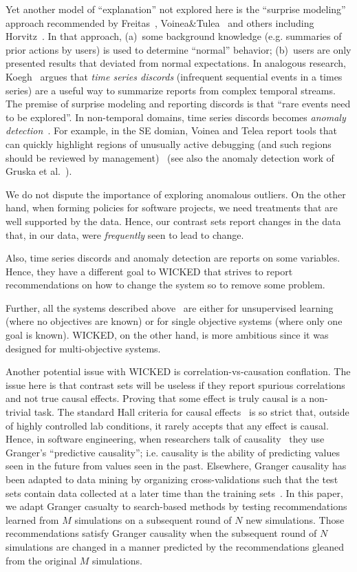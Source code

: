 \documentclass[runningheads]{llncs}
\begin{document}
Yet another model of ``explanation'' not explored
here is the ``surprise modeling'' approach
recommended by 
Freitas~\cite{Freitas98onobjective}, Voinea\&Tulea~\cite{voinea07} and
others including Horvitz~\cite{horvitz05}. In that
approach, (a)~some background knowledge
(e.g. summaries of prior actions by users) is used
to determine ``normal'' behavior; (b)~users are only
presented results that deviated from normal
expectations. In analogous research,
Koegh~\cite{keogh05} argues that {\em time series
  discords} (infrequent sequential events in a times
series) are a useful way to summarize reports from
complex temporal streams. The premise of surprise
modeling and reporting discords is that ``rare
events need to be explored''.  
In non-temporal domains, time series discords becomes
{\em anomaly detection}~\cite{chandola09}. For example, in the SE domian,
Voinea and Telea report tools that can quickly highlight regions
of unusually active debugging (and such regions should be reviewed
by management)~\cite{voiena07} (see also the anomaly
detection work of Gruska et al.~\cite{gruska10}).

We do not dispute the
importance of exploring anomalous outliers.  On the other
hand, when forming policies for software projects,
we need treatments that are well supported by the
data. Hence, our contrast sets report changes in the
data that, in our data, were {\em frequently} seen to
lead to change. 

Also, time series discords and anomaly detection are reports
on some variables. Hence, they have a different goal to WICKED that
strives to report recommendations on how to change the system
so to remove some problem. 

Further, all the systems described
above~\cite{voinea07,horvitz05,keogh05,gruska10} are
either for unsupervised learning (where no
objectives are known) or for single objective
systems (where only one goal is known). WICKED, on the
other hand, is more ambitious since it was designed
for multi-objective systems.

Another potential issue with WICKED is
correlation-vs-causation conflation. The issue here
is that contrast sets will be useless if they
report spurious correlations and not true causal
effects.  Proving that some effect is truly causal
is a non-trivial task.  The standard Hall criteria
for causal effects~\cite{paul13} is so strict that,
outside of highly controlled lab conditions, it
rarely accepts that any effect is causal.  Hence, in
software engineering, when researchers talk of
causality~\cite{couto14,zheng14z,huber09,bhat!icse12}
they use Granger's ``predictive causality'';
i.e. causality is the ability of predicting
values seen in the future from values seen in the
past.  Elsewhere, Granger causality has been adapted
to data mining by organizing cross-validations such
that the test sets contain data collected at a later
time than the training sets~\cite{me11f}.  In this
paper, we adapt Granger casualty to search-based
methods by testing recommendations learned from $M$
simulations on a subsequent round of $N$ new
simulations.  Those recommendations satisfy Granger
causality when the subsequent round of $N$
simulations are changed in a manner predicted by the
recommendations gleaned from the original $M$
simulations.
\end{document}
